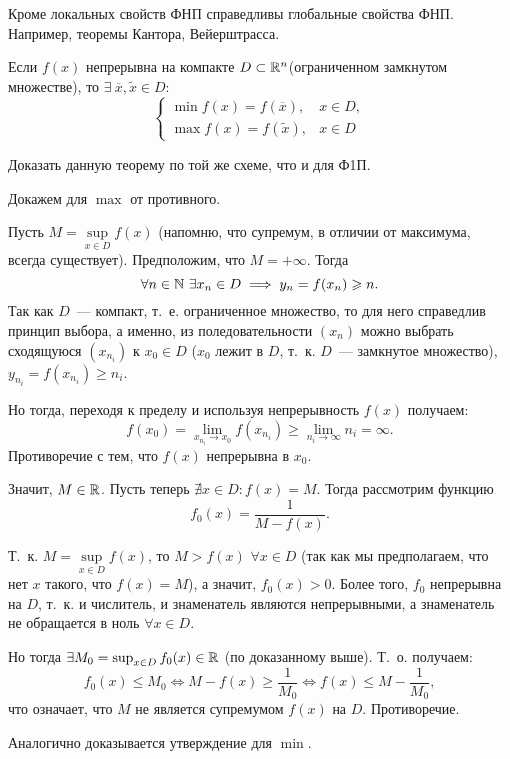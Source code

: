 \documentclass[../../main.tex]{subfiles}
\begin{document}
	Кроме локальных свойств ФНП справедливы глобальные свойства ФНП. Например,
	теоремы Кантора, Вейерштрасса.
	\begin{thm}[Вейерштрасс]
		Если $f(x)$ непрерывна на компакте $D \subset \mathbb{R}^n$(ограниченном 
		замкнутом множестве), то $\exists\ \overline{x}, \widetilde{x} \in D:$
		\[ 
		\begin{cases}
		\min f(x) = f(\overline{x}),& x \in D, \\
		\max f(x) = f(\widetilde{x}),& x \in D
		\end{cases}
		\]
	\end{thm}
	\begin{exc}
		Доказать данную теорему по той же схеме, что и для Ф1П.
	\end{exc}
	\begin{eans}
		Докажем для $\max$ от противного.
		
		Пусть $M = \sup\limits_{x\in D}f(x)$ (напомню, что супремум, в отличии от 
		максимума, всегда существует). 
		Предположим, что $M = +\infty$. Тогда
		\[\forall n\in\mathbb{N}\ \exists x_n\in D\implies y_n = f(x_n) \geqslant n.\]
		Так как $D$~--- компакт, т.~е. ограниченное множество, то для него 
		справедлив принцип выбора, а именно, из поледовательности $(x_n)$ можно 
		выбрать сходящуюся $\left(x_{n_i}\right)$ к $x_0\in D$ ($x_0$ лежит в $D$, 
		т.~к. $D$~--- замкнутое множество), $y_{n_{i}} = f\left(x_{n_{i}}\right) 
		\geq n_{i}$.
		
		Но тогда, переходя к пределу и используя непрерывность $f(x)$ получаем:
		\[f(x_0) = \lim_{x_{n_{i}}\to x_0}f\left(x_{n_i}\right)\geq 
		\lim_{n_i\to\infty}n_i = \infty.\]
		Противоречие с тем, что $f(x)$ непрерывна в $x_0$.
		
		Значит, $M\in \mathbb{R}$. Пусть теперь $\nexists x\in D\colon f(x) = M$. Тогда 
		рассмотрим функцию
		\[f_0(x) = \frac{1}{M - f(x)}.\]
		
		Т.~к. $M = \sup\limits_{x\in D} f(x)$, то $M > f(x)$ $\forall x\in D$ (так 
		как мы предполагаем, что нет $x$ такого, что $f(x) = M$), а значит, $f_0(x) 
		> 0$. Более того, $f_0$ непрерывна на $D$, т.~к. и числитель, и знаменатель 
		являются непрерывными, а знаменатель не обращается в ноль $\forall x\in D$.
		
		Но тогда $\exists M_0 = \sup_{x\in D}f_0(x)\in \mathbb{R}$ (по доказанному выше). 
		Т.~о. получаем:
		\[f_0(x)\leq M_0\iff M - f(x)\geq \frac{1}{M_0}\iff f(x)\leq M - 
		\frac{1}{M_0},\]
		что означает, что $M$ не является супремумом $f(x)$ на $D$. Противоречие.
		
		Аналогично доказывается утверждение для $\min$.
		
	\end{eans}
	\medskip
\end{document}
